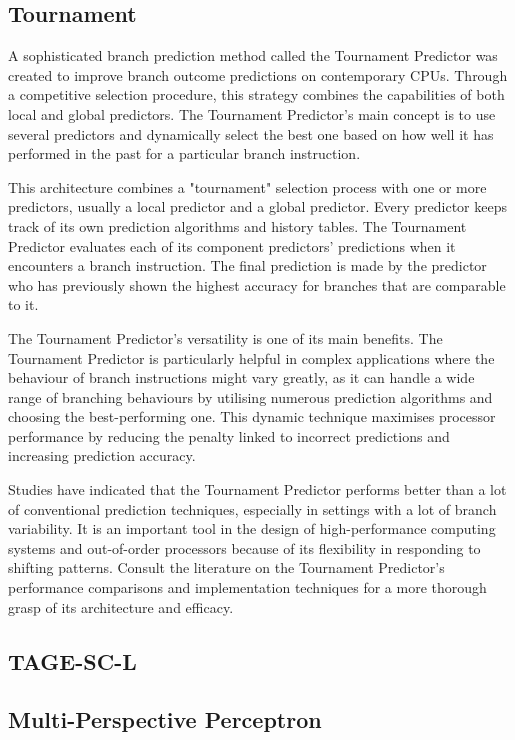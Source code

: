 \documentclass[10pt,journal,compsoc]{IEEEtran}
\begin{document}
\subsection{Tournament} 
\noindent A sophisticated branch prediction method called the Tournament Predictor was created to improve branch outcome predictions on contemporary CPUs. Through a competitive selection procedure, this strategy combines the capabilities of both local and global predictors. The Tournament Predictor's main concept is to use several predictors and dynamically select the best one based on how well it has performed in the past for a particular branch instruction.

This architecture combines a "tournament" selection process with one or more predictors, usually a local predictor and a global predictor. Every predictor keeps track of its own prediction algorithms and history tables. The Tournament Predictor evaluates each of its component predictors' predictions when it encounters a branch instruction. The final prediction is made by the predictor who has previously shown the highest accuracy for branches that are comparable to it.

The Tournament Predictor's versatility is one of its main benefits. The Tournament Predictor is particularly helpful in complex applications where the behaviour of branch instructions might vary greatly, as it can handle a wide range of branching behaviours by utilising numerous prediction algorithms and choosing the best-performing one. This dynamic technique maximises processor performance by reducing the penalty linked to incorrect predictions and increasing prediction accuracy.

Studies have indicated that the Tournament Predictor performs better than a lot of conventional prediction techniques, especially in settings with a lot of branch variability. It is an important tool in the design of high-performance computing systems and out-of-order processors because of its flexibility in responding to shifting patterns. Consult the literature on the Tournament Predictor's performance comparisons and implementation techniques for a more thorough grasp of its architecture and efficacy.
\subsection{TAGE-SC-L}
\noindent 
\subsection{Multi-Perspective Perceptron}
\noindent 
\end{document}
